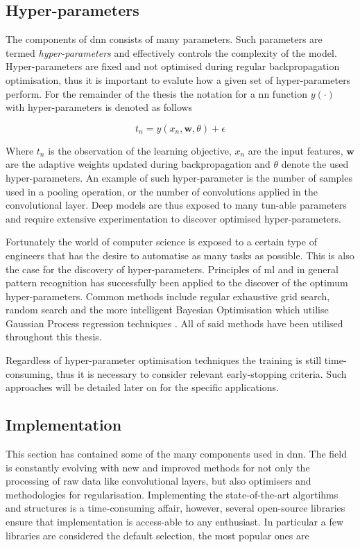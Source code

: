 \subsection{Hyper-parameters}

The components of \gls{dnn} consists of many parameters. Such parameters are termed \emph{hyper-parameters} and effectively controls the complexity of the model. Hyper-parameters are fixed and not optimised during regular backpropagation optimisation, thus it is important to evalute how a given set of hyper-parameters perform. For the remainder of the thesis the notation for a \gls{nn} function $y(\cdot)$ with hyper-parameters is denoted as follows

\begin{equation}
    t_n = y(x_n, \mathbf{w}, \theta) + \epsilon
\end{equation}

Where $t_n$ is the observation of the learning objective, $x_n$ are the input features, $\mathbf{w}$ are the adaptive weights updated during backpropagation and $\theta$ denote the used hyper-parameters. An example of such hyper-parameter is the number of samples used in a pooling operation, or the number of convolutions applied in the convolutional layer. Deep models are thus exposed to many tun-able parameters and require extensive experimentation to discover optimised hyper-parameters.

Fortunately the world of computer science is exposed to a certain type of engineers that has the desire to automatise as many tasks as possible. This is also the case for the discovery of hyper-parameters. Principles of \gls{ml} and in general pattern recognition has successfully been applied to the discover of the optimum hyper-parameters. Common methods include regular exhaustive grid search, random search and the more intelligent Bayesian Optimisation which utilise Gaussian Process regression techniques \cite{YuHyper-ParameterApplications}. All of said methods have been utilised throughout this thesis.

Regardless of hyper-parameter optimisation techniques the training is still time-consuming, thus it is necessary to consider relevant early-stopping criteria. Such approaches will be detailed later on for the specific applications.


\subsection{Implementation}
This section has contained some of the many components used in \gls{dnn}. The field is constantly evolving with new and improved methods for not only the processing of raw data like convolutional layers, but also optimisers and methodologies for regularisation.  Implementing the state-of-the-art algortihms and structures is a time-consuming affair, however, several open-source libraries ensure that implementation is access-able to any enthusiast. In particular a few libraries are considered the default selection, the most popular ones are 

